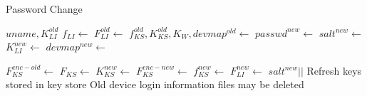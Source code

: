 \begin{algorithm}
\caption{Password Change}
\begin{algorithmic}[\LineNumFrequency]
\Input $uname, K_{LI}^{old}$
\State $f_{LI} \gets$ 
\State $F_{LI}^{old} \gets$ 
\State $f_{KS}^{old},K_{KS}^{old},K_W,devmap^{old} \gets$  
\State $passwd^{new} \gets$ 
\State $salt^{new} \gets$ \NewSalt
\State $K_{LI}^{new} \gets$ 
\State $devmap^{new} \gets$ \NewMap

\State $F_{KS}^{enc-old} \gets$ 
\State $F_{KS} \gets$ 
\State $K_{KS}^{new} \gets$ \NewKey
\State $F_{KS}^{enc-new} \gets$ 
\State $f_{KS}^{new} \gets$  %
\State $F_{LI}^{new} \gets$
\Statex $salt^{new} ||$ 
\State {} 
\State Refresh keys stored in key store
\State Old device login information files may be deleted
\end{algorithmic}
\end{algorithm}


% 
% 
% 


